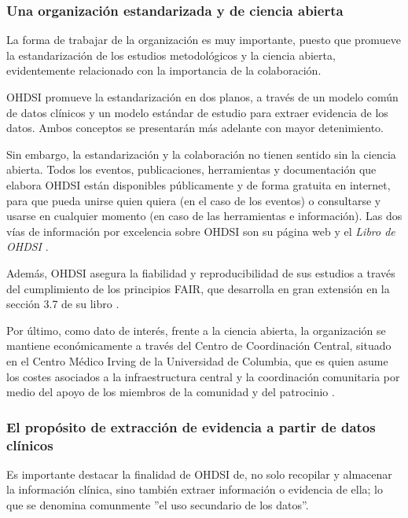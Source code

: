 \subsubsection{Una organización estandarizada y de ciencia abierta}

La forma de trabajar de la organización es muy importante, puesto que promueve la estandarización de los estudios metodológicos y la ciencia abierta, evidentemente relacionado con la importancia de la colaboración.

OHDSI promueve la estandarización en dos planos, a través de un modelo común de datos clínicos y un modelo estándar de estudio para extraer evidencia de los datos. Ambos conceptos se presentarán más adelante con mayor detenimiento.

Sin embargo, la estandarización y la colaboración no tienen sentido sin la ciencia abierta. Todos los eventos, publicaciones, herramientas y documentación que elabora OHDSI están disponibles públicamente y de forma gratuita en internet, para que pueda unirse quien quiera (en el caso de los eventos) o consultarse y usarse en cualquier momento (en caso de las herramientas e información). Las dos vías de información por excelencia sobre OHDSI son su página web \cite{OHDSIwebsite} y el \textit{Libro de OHDSI} \cite{OHDSIbook}.

Además, OHDSI asegura la fiabilidad y reproducibilidad de sus estudios a través del cumplimiento de los principios FAIR, que desarrolla en gran extensión en la sección 3.7 de su libro \cite{OHDSIbook}.
    
Por último, como dato de interés, frente a la ciencia abierta, la organización se mantiene económicamente a través del Centro de Coordinación Central, situado en el Centro Médico Irving de la Universidad de Columbia, que es quien asume los costes asociados a la infraestructura central y la coordinación comunitaria por medio del apoyo de los miembros de la comunidad y del patrocinio \cite{OHDSIwebsite}.

\subsubsection{El propósito de extracción de evidencia a partir de datos clínicos}

Es importante destacar la finalidad de OHDSI de, no solo recopilar y almacenar la información clínica, sino también extraer información o evidencia de ella; lo que se denomina comunmente ''el uso secundario de los datos''. 

